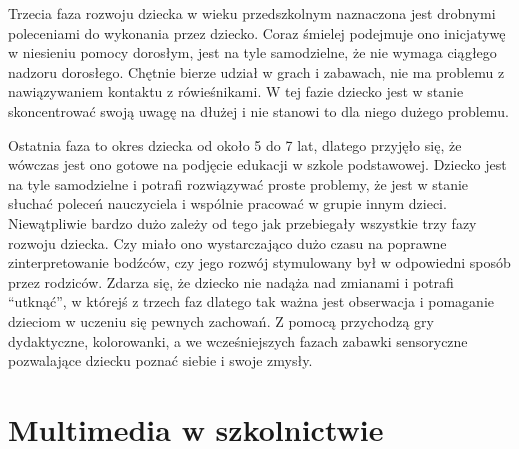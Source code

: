 \documentclass{article}
\begin{document}
\par
Trzecia faza rozwoju dziecka w wieku przedszkolnym naznaczona jest drobnymi poleceniami do wykonania przez dziecko. Coraz śmielej podejmuje ono inicjatywę w niesieniu pomocy dorosłym, jest na tyle samodzielne, że nie wymaga ciągłego nadzoru dorosłego. Chętnie bierze udział w grach i zabawach, nie ma problemu z nawiązywaniem kontaktu z rówieśnikami. W tej fazie dziecko jest w stanie skoncentrować swoją uwagę na dłużej i nie stanowi to dla niego dużego problemu.
\par
Ostatnia faza to okres dziecka od około 5 do 7 lat, dlatego przyjęło się, że wówczas jest ono gotowe na podjęcie edukacji w szkole podstawowej. Dziecko jest na tyle samodzielne i potrafi rozwiązywać proste problemy, że jest w stanie słuchać poleceń nauczyciela i wspólnie pracować w grupie innym dzieci. Niewątpliwie bardzo dużo zależy od tego jak przebiegały wszystkie trzy fazy rozwoju dziecka. Czy miało ono wystarczająco dużo czasu na poprawne zinterpretowanie bodźców, czy jego rozwój stymulowany był w odpowiedni sposób przez rodziców. Zdarza się, że dziecko nie nadąża nad zmianami i potrafi “utknąć”, w którejś z trzech faz dlatego tak ważna jest obserwacja i pomaganie dzieciom w uczeniu się pewnych zachowań. Z pomocą przychodzą gry dydaktyczne, kolorowanki, a we wcześniejszych fazach zabawki sensoryczne pozwalające dziecku poznać siebie i swoje zmysły.



\section{Multimedia w szkolnictwie}
\end{document}
